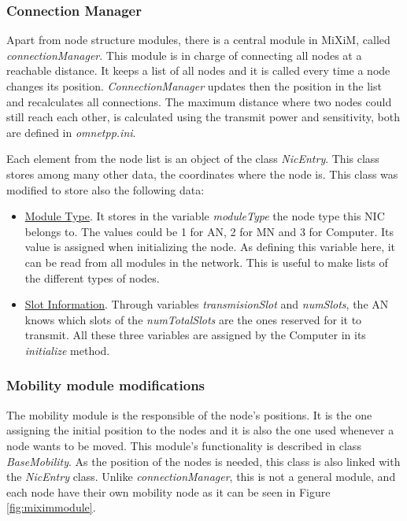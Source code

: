 \subsubsection{Connection Manager}

Apart from node structure modules, there is a central module in \ac{MiXiM}, called \textit{connectionManager}. This module is in charge of connecting
all nodes at a reachable distance. It keeps a list of all nodes and it is called every time a node changes its position. \textit{ConnectionManager} 
updates then the position in the list and recalculates all connections. The maximum distance where two nodes could still reach each other, is 
calculated using the transmit power and sensitivity, both are defined in \textit{omnetpp.ini}.

Each element from the node list is an object of the class \textit{NicEntry}. This class stores among many other data, the coordinates where the node is.
This class was modified to store also the following data:

\begin{itemize}
 \item \underline{Module Type}. It stores in the variable \textit{moduleType} the node type this \ac{NIC} belongs to. The values could be 1 for \ac{AN}, 
2 for \ac{MN} and 3 for Computer. Its value is assigned when initializing the node. As defining this variable here, it can be read from all modules in the 
network. This is useful to make lists of the different types of nodes.
 \item \underline{Slot Information}. Through variables \textit{transmisionSlot} and \textit{numSlots}, the \ac{AN} knows which slots of the 
\textit{numTotalSlots} are the ones reserved for it to transmit. All these three variables are assigned by the Computer in its \textit{initialize} method.
\end{itemize}

\subsubsection{Mobility module modifications}

The mobility module is the responsible of the node's positions. It is the one assigning the initial position to the nodes and it is also the one
used whenever a node wants to be moved. This module's functionality is described in class \textit{BaseMobility}. As the position of the nodes is needed,
this class is also linked with the \textit{NicEntry} class. Unlike \textit{connectionManager}, this is not a general module, and each node have their own
mobility node as it can be seen in Figure \ref{fig:miximmodule}.

